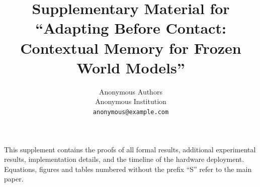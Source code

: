 \documentclass{article}
\title{Supplementary Material for\\``Adapting Before Contact: Contextual Memory for Frozen World Models''}
\author{
  Anonymous Authors\\
  Anonymous Institution\\
  \texttt{anonymous@example.com}
}
\begin{document}
\nolinenumbers
\maketitle

\noindent This supplement contains the proofs of all formal results, additional experimental results, implementation details, and the timeline of the hardware deployment. Equations, figures and tables numbered without the prefix ``S'' refer to the main paper.

\appendix



\end{document}
